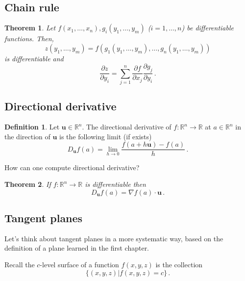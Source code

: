 \documentclass[
]{article}
\newtheorem{theorem}{Theorem}[section]
\theoremstyle{definition}
\newtheorem{definition}{Definition}[section]
\theoremstyle{definition}
\theoremstyle{definition}
\theoremstyle{definition}
\theoremstyle{remark}
\begin{document}
\subsection{Chain rule}\label{chain-rule}

\begin{theorem}
Let \(f(x_1,\dots, x_n), g_i(y_1,\dots, y_m)\) (\(i = 1,\dots, n\)) be
differentiable
functions.
Then,
\[z(y_1, \dots, y_m) = f(g_1(y_1, \dots, y_m), \dots, g_n(y_1, \dots, y_m))\]
is differentiable and
\begin{equation*}
    \frac{\partial z}{\partial y_i} = \sum_{j=1}^n \frac{\partial f}{\partial x_j} \frac{\partial g_j}{\partial y_i} \,.
\end{equation*}
\end{theorem}

\subsection{Directional derivative}\label{directional-derivative}

\begin{definition}
Let \(\mathbf{u} \in \mathbb{R}^n\). The directional derivative of \(f:\mathbb{R}^n \to \mathbb{R}\) at \(a\in \mathbb{R}^n\)
in the direction of \(\mathbf{u}\) is the following limit (if exists)
\begin{equation*}
    D_{\mathbf{u}} f(a) = \lim_{h \to 0} \frac{ f( a + h \mathbf{u}) - f(a)}{h}\,.
\end{equation*}
\end{definition}

How can one compute directional derivative?

\begin{theorem}
If \(f:\mathbb{R}^n \to \mathbb{R}\) is differentiable then
\begin{equation*}
    D_{\mathbf{u}} f(a) = \nabla f(a) \cdot \mathbf{u} \,.
\end{equation*}
\end{theorem}

\subsection{Tangent planes}\label{tangent-planes}

Let's think about tangent planes in a more systematic way, based on the definition
of a plane learned in the first chapter.

Recall the \(c\)-level surface of a function \(f(x,y,z)\) is the collection
\begin{equation*}
    \{ (x,y,z) | f(x,y,z) = c \} \,.
\end{equation*}
\end{document}
